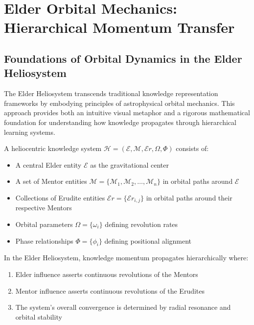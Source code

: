 \chapter{Elder Orbital Mechanics: Hierarchical Momentum Transfer}

\section{Foundations of Orbital Dynamics in the Elder Heliosystem}

The Elder Heliosystem transcends traditional knowledge representation frameworks by embodying principles of astrophysical orbital mechanics. This approach provides both an intuitive visual metaphor and a rigorous mathematical foundation for understanding how knowledge propagates through hierarchical learning systems.

\begin{definition}
A heliocentric knowledge system $\mathcal{H} = (\mathcal{E}, \mathcal{M}, \mathcal{E}r, \Omega, \Phi)$ consists of:
\begin{itemize}
    \item A central Elder entity $\mathcal{E}$ as the gravitational center
    \item A set of Mentor entities $\mathcal{M} = \{\mathcal{M}_1, \mathcal{M}_2, \ldots, \mathcal{M}_n\}$ in orbital paths around $\mathcal{E}$
    \item Collections of Erudite entities $\mathcal{E}r = \{\mathcal{E}r_{i,j}\}$ in orbital paths around their respective Mentors
    \item Orbital parameters $\Omega = \{\omega_i\}$ defining revolution rates
    \item Phase relationships $\Phi = \{\phi_i\}$ defining positional alignment
\end{itemize}
\end{definition}

\begin{theorem}
In the Elder Heliosystem, knowledge momentum propagates hierarchically where:
\begin{enumerate}
    \item Elder influence asserts continuous revolutions of the Mentors
    \item Mentor influence asserts continuous revolutions of the Erudites
    \item The system's overall convergence is determined by radial resonance and orbital stability
\end{enumerate}
\end{theorem}

